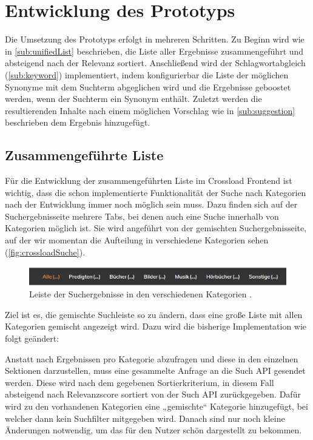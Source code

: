 \chapter{Entwicklung des Prototyps}
\label{ch:development}

Die Umsetzung des Prototyps erfolgt in mehreren Schritten. Zu Beginn wird wie in \ref{sub:unifiedList} beschrieben, die Liste aller Ergebnisse zusammengeführt und absteigend nach der Relevanz sortiert. Anschließend wird der Schlagwortabgleich (\ref{sub:keyword}) implementiert, indem konfigurierbar die Liste der möglichen Synonyme mit dem Suchterm abgeglichen wird und die Ergebnisse geboostet werden, wenn der Suchterm ein Synonym enthält. Zuletzt werden die resultierenden Inhalte nach einem möglichen Vorschlag wie in \ref{sub:suggestion} beschrieben dem Ergebnis hinzugefügt.

\section{Zusammengeführte Liste}
\label{sec:devUnifiedList}

Für die Entwicklung der zusammengeführten Liste im Crossload Frontend ist wichtig, dass die schon implementierte Funktionalität der Suche nach Kategorien nach der Entwicklung immer noch möglich sein muss.
Dazu finden sich auf der Suchergebnisseite mehrere Tabs, bei denen auch eine Suche innerhalb von Kategorien möglich ist.
Sie wird angeführt von der gemischten Suchergebnisseite, auf der wir momentan die Aufteilung in verschiedene Kategorien sehen (\ref{fig:crossloadSuche}).

\begin{figure}[h]
  \begin{centering}
    \includegraphics[width=\textwidth]{figures/development/kategorienLeiste.png}
    \caption{Leiste der Suchergebnisse in den verschiedenen Kategorien \cite{pfleiderer2022}.}
    \label{fig:kategorienLeiste}
  \end{centering}
\end{figure}

Ziel ist es, die gemischte Suchleiste so zu ändern, dass eine große Liste mit allen Kategorien gemischt angezeigt wird.
Dazu wird die bisherige Implementation wie folgt geändert:

Anstatt nach Ergebnissen pro Kategorie abzufragen und diese in den einzelnen Sektionen darzustellen, muss eine gesammelte Anfrage an die Such API gesendet werden.
Diese wird nach dem gegebenen Sortierkriterium, in diesem Fall absteigend nach Relevanzscore sortiert von der Such API zurückgegeben.
Dafür wird zu den vorhandenen Kategorien eine „gemischte“ Kategorie hinzugefügt, bei welcher dann kein Suchfilter mitgegeben wird.
Danach sind nur noch kleine Änderungen notwendig, um das für den Nutzer schön dargestellt zu bekommen.

